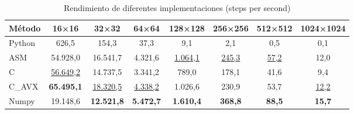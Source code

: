 \documentclass[a4paper]{article}
\begin{document}
\begin{table}[h]
    \centering
    \caption{Rendimiento de diferentes implementaciones (steps per second)}
    \label{tab:performance_results}
    \begin{tabular}{lccccccc}
        \toprule
        \textbf{Método} & \textbf{16×16}       & \textbf{32×32}       & \textbf{64×64}      & \textbf{128×128}    & \textbf{256×256}  & \textbf{512×512} & \textbf{1024×1024} \\
        \midrule
        Python          & 626,5                & 154,3                & 37,3                & 9,1                 & 2,1               & 0,5              & 0,1                \\
        ASM             & 54.928,0             & 16.541,7             & 4.321,6             & \underline{1.064,1} & \underline{245,3} & \underline{57,2} & 12,0               \\
        C               & \underline{56.649,2} & 14.737,5             & 3.341,2             & 789,0               & 178,1             & 41,6             & 9,4                \\
        C\_AVX          & \textbf{65.495,1}    & \underline{18.320,5} & \underline{4.338,2} & 1.026,6             & 230,9             & 53,7             & \underline{12,2}   \\
        Numpy           & 19.148,6             & \textbf{12.521,8}    & \textbf{5.472,7}    & \textbf{1.610,4}    & \textbf{368,8 }   & \textbf{88,5}    & \textbf{15,7}      \\
        \bottomrule
    \end{tabular}
\end{table}
\end{document}

